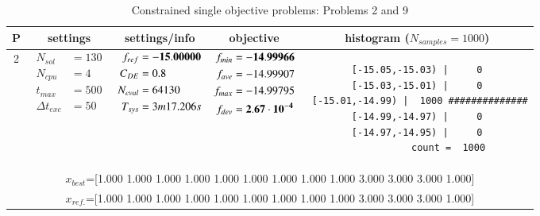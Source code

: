 \begin{table*} [!t] \centering
\caption{Constrained single objective problems: Problems 2 and 9}
\scriptsize  \setlength{\tabcolsep}{0.5em}

\begin{tabular}[c]{ccccc} \toprule
P & settings & settings/info & objective & histogram ($N_{samples}=1000$) \\ \hline

2
&
{$\!\begin{aligned}
    N_{sol}        &= 130 \\
	N_{cpu}        &= 4 \\
	t_{max}        &= 500 \\
	\Delta t_{exc} &= 50
\end{aligned}$}
&
{$\!\begin{aligned}
	f_{ref} &= {\bf -15.00000} \\
	C_{DE}   &= 0.8 \\
	N_{eval} &= 64130 \\
	T_{sys}  &= 3m17.206s
\end{aligned}$}
&
{$\!\begin{aligned}
    f_{min} &= {\bf -14.99966} \\
    f_{ave} &= -14.99907 \\
    f_{max} &= -14.99795 \\
    f_{dev} &= {\bf 2.67\cdot 10^{-4}}
\end{aligned}$}
&
\begin{minipage}{4.1cm} \fontsize{5pt}{6pt}
\begin{verbatim}
 [-15.05,-15.03) |     0 
 [-15.03,-15.01) |     0 
 [-15.01,-14.99) |  1000 ##############
 [-14.99,-14.97) |     0 
 [-14.97,-14.95) |     0 
           count =  1000
 \end{verbatim}
\end{minipage} \\
\multicolumn{5}{c}{{\scriptsize $x_{best}$=[1.000 1.000 1.000 1.000 1.000 1.000 1.000 1.000 1.000 3.000 3.000 3.000 1.000]}} \\
\multicolumn{5}{c}{{\scriptsize $x_{ref.}$=[1.000 1.000 1.000 1.000 1.000 1.000 1.000 1.000 1.000 3.000 3.000 3.000 1.000]}} \\


\hline



\end{tabular}
\end{table*}
